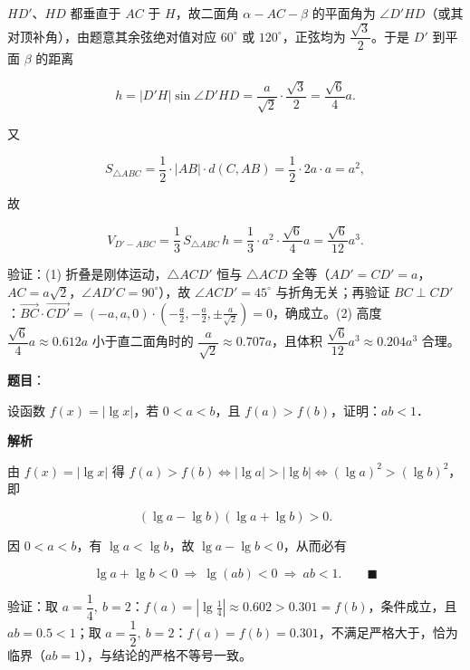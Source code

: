 \begin{answer}

$HD'$、$HD$ 都垂直于 $AC$ 于 $H$，故二面角 $\alpha-AC-\beta$ 的平面角为 $\angle D'HD$（或其对顶补角），由题意其余弦绝对值对应 $60^\circ$ 或 $120^\circ$，正弦均为 $\dfrac{\sqrt3}{2}$。于是 $D'$ 到平面 $\beta$ 的距离

\nopagebreak[4]
\[h=|D'H|\sin\angle D'HD=\frac{a}{\sqrt2}\cdot\frac{\sqrt3}{2}=\frac{\sqrt6}{4}a .\]

又

\nopagebreak[4]
\[S_{\triangle ABC}=\frac12\cdot|AB|\cdot d(C,AB)=\frac12\cdot2a\cdot a=a^2 ,\]

故

\nopagebreak[4]
\[V_{D'-ABC}=\frac13\,S_{\triangle ABC}\,h=\frac13\cdot a^2\cdot\frac{\sqrt6}{4}a=\frac{\sqrt6}{12}a^3 .\]

验证：(1) 折叠是刚体运动，$\triangle ACD'$ 恒与 $\triangle ACD$ 全等（$AD'=CD'=a$，$AC=a\sqrt2$，$\angle AD'C=90^\circ$），故 $\angle ACD'=45^\circ$ 与折角无关；再验证 $BC\perp CD'$：$\overrightarrow{BC}\cdot\overrightarrow{CD'}=(-a,a,0)\cdot\left(-\tfrac a2,-\tfrac a2,\pm\tfrac{a}{\sqrt2}\right)=0$，确成立。(2) 高度 $\dfrac{\sqrt6}{4}a\approx0.612a$ 小于直二面角时的 $\dfrac{a}{\sqrt2}\approx0.707a$，且体积 $\dfrac{\sqrt6}{12}a^3\approx0.204a^3$ 合理。



\par\medskip

\end{answer}
\begin{answer}

\textbf{题目}：

设函数 $f(x) = |\lg x|$，若 $0 < a < b$，且 $f(a) > f(b)$，证明：$ab < 1$．

\textbf{解析}

由 $f(x)=|\lg x|$ 得 $f(a)>f(b)\iff|\lg a|>|\lg b|\iff(\lg a)^2>(\lg b)^2$，即

\nopagebreak[4]
\[(\lg a-\lg b)(\lg a+\lg b)>0 .\]

因 $0<a<b$，有 $\lg a<\lg b$，故 $\lg a-\lg b<0$，从而必有

\nopagebreak[4]
\[\lg a+\lg b<0\ \Longrightarrow\ \lg(ab)<0\ \Longrightarrow\ ab<1 . \qquad\blacksquare\]

验证：取 $a=\dfrac14,\ b=2$：$f(a)=|\lg\tfrac14|\approx0.602>0.301=f(b)$，条件成立，且 $ab=0.5<1$；取 $a=\dfrac12,\ b=2$：$f(a)=f(b)=0.301$，不满足严格大于，恰为临界（$ab=1$），与结论的严格不等号一致。


\par\medskip

\end{answer}
